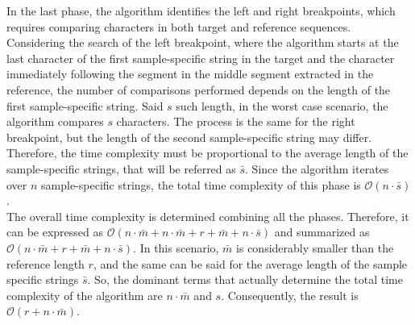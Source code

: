 In the last phase, the algorithm identifies the left and right breakpoints, which requires comparing characters in both target and reference sequences. Considering the search of the left breakpoint, where the algorithm starts at the last character of the first sample-specific string in the target and the character immediately following the segment in the middle segment extracted in the reference, the number of comparisons performed depends on the length of the first sample-specific string. Said \( s \) such length, in the worst case scenario, the algorithm compares \( s \) characters. The process is the same for the right breakpoint, but the length of the second sample-specific string may differ. Therefore, the time complexity must be proportional to the average length of the sample-specific strings, that will be referred as $\bar{s}$. Since the algorithm iterates over \( n \) sample-specific strings, the total time complexity of this phase is $\mathcal{O}(n \cdot \bar{s} )$. \\

The overall time complexity is determined combining all the phases. Therefore, it can be expressed as $\mathcal{O}(n \cdot \bar{m} + n \cdot \bar{m} + r + \bar{m} + n \cdot \bar{s})$ and summarized as $\mathcal{O}(n \cdot \bar{m} + r + \bar{m} + n \cdot \bar{s})$. In this scenario, $\bar{m}$ is considerably smaller than the reference length  \( r \), and the same can be said for the average length of the sample specific strings \( \bar{s} \). So, the dominant terms that actually determine the total time complexity of the algorithm are $n \cdot \bar{m}$ and \( s \). Consequently, the result is $\mathcal{O}(r + n \cdot \bar{m} )$. \\


